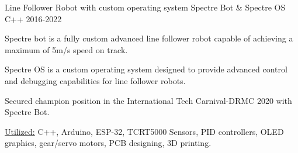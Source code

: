 \begin{cventries}
            \cventryprojects
            {Line Follower Robot with custom operating system} %
            {Spectre Bot \& Spectre OS} %
            {C++} %
            {2016-2022} %
            {
              \begin{cvitems} %
                \item {Spectre bot is a fully custom advanced line 
                follower robot capable of achieving a maximum of 5m/s speed on track.}
                \item {Spectre OS is a custom operating system designed to provide advanced control and 
                debugging capabilities for line follower robots.}
                \item {Secured champion position in the International Tech Carnival-DRMC 2020 with Spectre Bot.}
                \item {\underline{Utilized:} C++, Arduino, ESP-32, TCRT5000 Sensors, PID controllers, OLED graphics, gear/servo motors, PCB designing, 3D printing.}
              \end{cvitems}
              }
\end{cventries}
